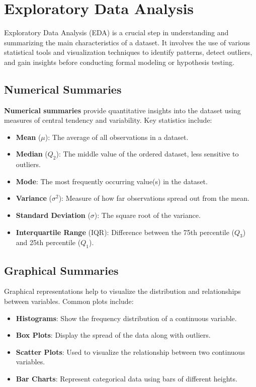 \section{Exploratory Data Analysis}

Exploratory Data Analysis (EDA) is a crucial step in understanding and summarizing the main characteristics of a dataset. It involves the use of various statistical tools and visualization techniques to identify patterns, detect outliers, and gain insights before conducting formal modeling or hypothesis testing.

\subsection{Numerical Summaries}
\textbf{Numerical summaries} provide quantitative insights into the dataset using measures of central tendency and variability. Key statistics include:

\begin{itemize}
    \item \textbf{Mean} (\(\mu\)): The average of all observations in a dataset.
    \item \textbf{Median} (\(Q_2\)): The middle value of the ordered dataset, less sensitive to outliers.
    \item \textbf{Mode}: The most frequently occurring value(s) in the dataset.
    \item \textbf{Variance} (\(\sigma^2\)): Measure of how far observations spread out from the mean.
    \item \textbf{Standard Deviation} (\(\sigma\)): The square root of the variance.
    \item \textbf{Interquartile Range} (IQR): Difference between the 75th percentile (\(Q_3\)) and 25th percentile (\(Q_1\)).
\end{itemize}

\subsection{Graphical Summaries}
Graphical representations help to visualize the distribution and relationships between variables. Common plots include:

\begin{itemize}
    \item \textbf{Histograms}: Show the frequency distribution of a continuous variable.
    \item \textbf{Box Plots}: Display the spread of the data along with outliers.
    \item \textbf{Scatter Plots}: Used to visualize the relationship between two continuous variables.
    \item \textbf{Bar Charts}: Represent categorical data using bars of different heights.
\end{itemize}

